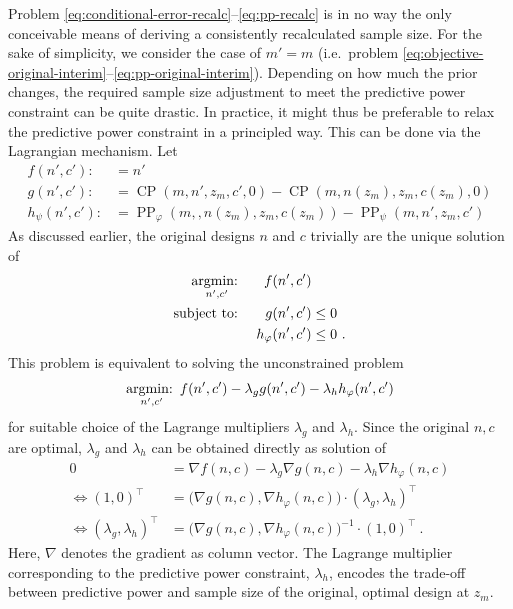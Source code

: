 \documentclass[12pt]{article}
\newcommand{\st}{\operatorname{subject\ to:\ }}
\newcommand{\argmin}[1]{\operatornamewithlimits{argmin:\ }_{#1}}
\newcommand{\CP}{\ensuremath{\operatorname{CP}}}
\newcommand{\PP}{\ensuremath{\operatorname{PP}}}
\begin{document}
Problem \eqref{eq:conditional-error-recalc}--\eqref{eq:pp-recalc} is in no way the only conceivable
means of deriving a consistently recalculated sample size.
For the sake of simplicity, we consider the case of $m'=m$ (i.e.~problem \eqref{eq:objective-original-interim}--\eqref{eq:pp-original-interim}).
Depending on how much the prior changes,
the required sample size adjustment to meet the predictive power constraint can be quite drastic.
In practice, it might thus be preferable to relax the predictive power constraint in a principled way.
This can be done via the Lagrangian mechanism.
Let
\begin{align}
    f(n', c') :&= n' \\
    g(n', c') :&= \CP(m, n', z_{m}, c', 0) - \CP(m, n(z_m), z_{m}, c(z_m), 0) \\
    h_\psi(n', c') :&= \PP_\varphi(m, , n(z_m), z_{m}, c(z_m)) - \PP_\psi(m, n', z_{m}, c')
\end{align}
As discussed earlier, the original designs $n$ and $c$ trivially are the unique solution of
\begin{align}
    \argmin{n',c'} && f(n',c') & \\
    \st
    && g(n',c') &\leq 0 \\
    && h_\varphi(n',c') &\leq 0 \ .
\end{align}
This problem is equivalent to solving the unconstrained problem
\begin{align}
    \argmin{n',c'} f(n',c') - \lambda_g g(n',c') - \lambda_h h_\varphi(n',c')
\end{align}
for suitable choice of the Lagrange multipliers $\lambda_g$ and $\lambda_h$.
Since the original $n, c$ are optimal,
$\lambda_g$ and $\lambda_h$ can be obtained directly as solution of
\begin{align}
    0 &= \nabla f(n, c) - \lambda_g \nabla g(n, c) - \lambda_h \nabla h_\varphi(n, c) \\
   \Leftrightarrow (1, 0)^\top &= \big(\nabla g(n, c), \nabla h_\varphi(n, c)\big) \cdot (\lambda_g, \lambda_h)^\top \\
   \Leftrightarrow (\lambda_g, \lambda_h)^\top &= \big(\nabla g(n, c), \nabla h_\varphi(n, c)\big)^{-1} \cdot (1, 0)^\top\ .
\end{align}
Here, $\nabla$ denotes the gradient as column vector.
The Lagrange multiplier corresponding to the predictive power constraint, $\lambda_h$, encodes the trade-off between predictive power and sample size of the original,
optimal design at $z_m$.
\end{document}
